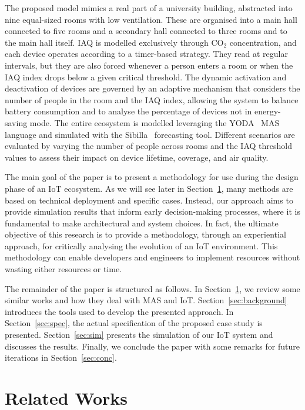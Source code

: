 \documentclass[runningheads]{llncs}
\newcommand{\yoda}{\textsf{YODA}}
\newcommand{\sibilla}{\textsf{Sibilla}}
\begin{document}
The proposed model mimics a real part of a university building, abstracted into nine equal-sized rooms with low ventilation. These are organised into a main hall connected to five rooms and a secondary hall connected to three rooms and to the main hall itself.
%
IAQ is modelled exclusively through CO$_2$ concentration, and each device operates according to a timer-based strategy. They read at regular intervals, but they are also forced whenever a person enters a room or when the IAQ index drops below a given critical threshold. 
%
%
The dynamic activation and deactivation of devices are governed by an adaptive mechanism that considers the number of people in the room and the IAQ index, allowing the system to balance battery consumption and to analyse the percentage of devices not in energy-saving mode.
%
The entire ecosystem is modelled leveraging the \yoda{}~\cite{yoda} MAS language and simulated with the \sibilla{}~\cite{sibilla} forecasting tool. Different scenarios are evaluated by varying the number of people across rooms and the IAQ threshold values to assess their impact on device lifetime, coverage, and air quality.

The main goal of the paper is to present a methodology for use during the design phase of an IoT ecosystem.
%
As we will see later in Section~\ref{sec:related}, many methods are based on technical deployment and specific cases.
%
Instead, our approach aims to provide simulation results that inform early decision-making processes, where it is fundamental to make architectural and system choices.
%
In fact, the ultimate objective of this research is to provide a methodology, through an experiential approach, for critically analysing the evolution of an IoT environment. This methodology can enable developers and engineers to implement resources without wasting either resources or time.

The remainder of the paper is structured as follows.
%
In Section~\ref{sec:related}, we review some similar works and how they deal with MAS and IoT.
%
Section~\ref{sec:background} introduces the tools used to develop the presented approach.
%
In Section~\ref{sec:spec}, the actual specification of the proposed case study is presented.
%
Section~\ref{sec:sim} presents the simulation of our IoT system and discusses the results.
%
Finally, we conclude the paper with some remarks for future iterations in Section~\ref{sec:conc}.
%

\section{Related Works}\label{sec:related}
\end{document}
